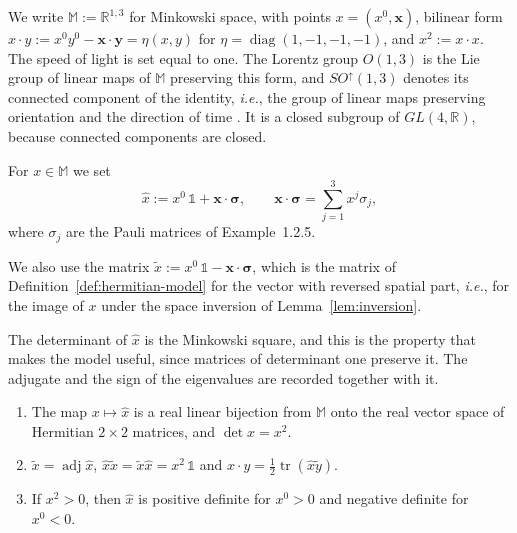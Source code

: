 We write $\mathbb{M}:=\mathbb{R}^{1,3}$ for Minkowski space, with points $x=(x^0,\mathbf{x})$, bilinear form $x\cdot y:=x^0y^0-\mathbf{x}\cdot\mathbf{y}=\eta(x,y)$ for $\eta=\operatorname{diag}(1,-1,-1,-1)$, and $x^2:=x\cdot x$. The speed of light is set equal to one. The Lorentz group $O(1,3)$ is the Lie group of linear maps of $\mathbb{M}$ preserving this form, and $SO^\uparrow(1,3)$ denotes its connected component of the identity, \textit{i.e.}, the group of linear maps preserving orientation and the direction of time \cite[TODO-location]{TODO-BarutRaczka}. It is a closed subgroup of $GL(4,\mathbb{R})$, because connected components are closed.

\begin{definition}\label{def:hermitian-model}
	For $x\in\mathbb{M}$ we set
	\begin{equation}\label{eq:hermitian-map}
		\hat{x}:=x^0\,\mathbb{1}+\mathbf{x}\cdot\boldsymbol{\sigma}, \qquad \mathbf{x}\cdot\boldsymbol{\sigma}=\sum_{j=1}^3x^j\sigma_j,
	\end{equation}
	where $\sigma_j$ are the Pauli matrices of Example~1.2.5.
\end{definition}

\begin{remark}
	We also use the matrix $\tilde{x}:=x^0\,\mathbb{1}-\mathbf{x}\cdot\boldsymbol{\sigma}$, which is the matrix of Definition~\ref{def:hermitian-model} for the vector with reversed spatial part, \textit{i.e.}, for the image of $x$ under the space inversion of Lemma~\ref{lem:inversion}.
\end{remark}

The determinant of $\hat{x}$ is the Minkowski square, and this is the property that makes the model useful, since matrices of determinant one preserve it. The adjugate and the sign of the eigenvalues are recorded together with it.

\begin{lemma}\label{lem:hermitian-model}
	\begin{enumerate}
		\item The map $x\mapsto\hat{x}$ is a real linear bijection from $\mathbb{M}$ onto the real vector space of Hermitian $2\times2$ matrices, and $\det\hat{x}=x^2$.
		\item $\tilde{x}=\operatorname{adj}\hat{x}$, $\hat{x}\tilde{x}=\tilde{x}\hat{x}=x^2\,\mathbb{1}$ and $x\cdot y=\tfrac12\operatorname{tr}(\hat{x}\tilde{y})$.
		\item If $x^2>0$, then $\hat{x}$ is positive definite for $x^0>0$ and negative definite for $x^0<0$.
	\end{enumerate}
\end{lemma}

